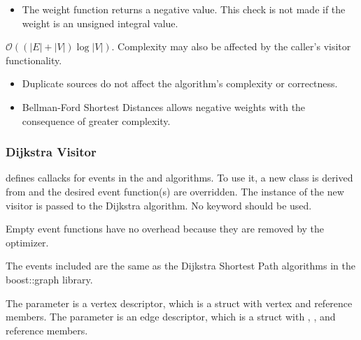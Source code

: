\begin{itemdescr}
\begin{itemize}
\begin{itemize}
                              \item The weight function returns a negative value. This check is not made if the weight
                                    is an unsigned integral value.
                        \end{itemize}
            \end{itemize}
      \pnum\complexity
                        $\mathcal{O}((|E| + |V|)\log{|V|})$. 
                        Complexity may also be affected by the caller's visitor functionality. \\
      \pnum\remarks 
            \begin{itemize}
                  \item Duplicate sources do not affect the algorithm's complexity or correctness.
                  \item Bellman-Ford Shortest Distances allows negative weights with the consequence of greater complexity.
            \end{itemize}
\end{itemdescr}

\subsubsection{Dijkstra Visitor}
 defines callacks for events in the 
and  algorithms. To use it, a new class is derived from 
 and the desired event function(s) are overridden. The instance of the
new visitor is passed to the Dijkstra algorithm. No  keyword should be used.

Empty event functions have no overhead because they are removed by the optimizer. 

The events included are the same as the Dijkstra Shortest Path algorithms in the boost::graph 
library.

The  parameter is a vertex descriptor, which is a struct with vertex  and 
reference members. The  parameter is an edge descriptor, which is a struct with ,
, and  reference members.

